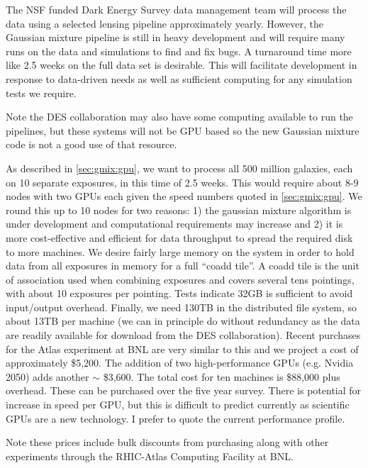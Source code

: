\documentclass[12pt]{article}
\begin{document}
The NSF funded Dark Energy Survey data management team will process the data
using a selected lensing pipeline approximately yearly.  However, the Gaussian
mixture pipeline is still in heavy development and will require many runs on
the data and simulations to find and fix bugs.  A turnaround time more like 2.5
weeks on the full data set is desirable.   This will facilitate development in
response to data-driven needs as well as sufficient computing for any
simulation tests we require.

Note the DES collaboration may also have some computing available to run the
pipelines, but these systems will not be GPU based so the new Gaussian mixture
code is not a good use of that resource.  

As described in \ref{sec:gmix:gpu}, we want to process all 500 million
galaxies, each on 10 separate exposures, in this time of 2.5 weeks. This would
require about 8-9 nodes with two GPUs each given the speed numbers quoted in
\ref{sec:gmix:gpu}.  We round this up to 10 nodes for two reasons: 1) the
gaussian mixture algorithm is under development and computational requirements
may increase and 2) it is more cost-effective and efficient for data throughput
to spread the required disk to more machines.  We desire fairly large memory on
the system in order to hold data from all exposures in memory for a full
``coadd tile''. A coadd tile is the unit of association used when combining
exposures and covers several tens pointings, with about 10 exposures per
pointing.  Tests indicate 32GB is sufficient to avoid input/output overhead.
Finally, we need 130TB in the distributed file system, so about 13TB per
machine (we can in principle do without redundancy as the data are readily
available for download from the DES collaboration).  Recent purchases for the
Atlas experiment at BNL are very similar to this and we project a cost of
approximately \$5,200.  The addition of two high-performance GPUs (e.g. Nvidia
2050) adds another $\sim$ \$3,600.  The total cost for ten machines is \$88,000
plus overhead.  These can be purchased over the five year survey.  There is
potential for increase in speed per GPU, but this is difficult to predict
currently as scientific GPUs are a new technology.  I prefer to quote the
current performance profile.

Note these prices include bulk discounts from purchasing along with other
experiments through the RHIC-Atlas Computing Facility at BNL.  


\end{document}
